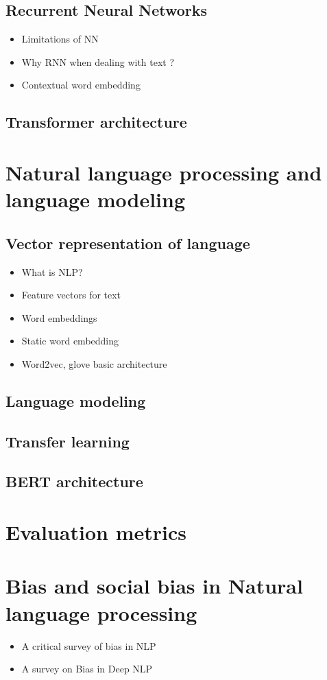 \subsection { Recurrent Neural Networks }
            \begin{itemize}
                \item Limitations of NN 
                \item Why RNN when dealing with text ?
                \item Contextual word embedding
            \end{itemize}

\subsection{Transformer architecture}
    
\section{Natural language processing and language modeling}
    \subsection{Vector representation of language}
    \begin{itemize}
        \item What is NLP?
        \item Feature vectors for text 
        \item Word embeddings
        \item Static word embedding
        \item Word2vec, glove basic architecture
    \end{itemize}
    \subsection{Language modeling}
    \subsection{Transfer learning}
    \subsection{BERT architecture}
\section {Evaluation metrics}    
\section{Bias and social bias in Natural language processing}
\begin{itemize}
    \item A critical survey of bias in NLP \cite{blodgett2020language}
    \item A survey on Bias in Deep NLP \cite{garrido2021survey}
\end{itemize}